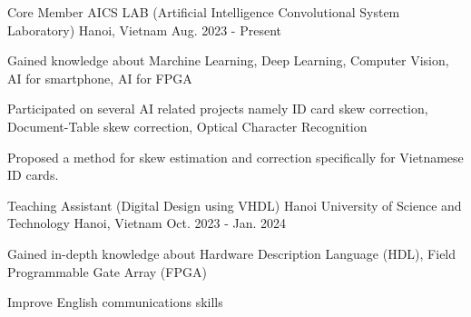 

\begin{cventries}
\cventry
{Core Member} %
{AICS LAB (Artificial Intelligence Convolutional System Laboratory)} %
{Hanoi, Vietnam} %
{Aug. 2023 - Present} %
{
  \begin{cvitems} %
    \item {Gained knowledge about Marchine Learning, Deep Learning, Computer Vision, AI for smartphone, AI for FPGA}
    \item {Participated on several AI related projects namely ID card skew correction, Document-Table skew correction, Optical Character Recognition}
    \item Proposed a method for skew estimation and correction specifically for
    Vietnamese ID cards.
  \end{cvitems}
}

\cventry
{Teaching Assistant (Digital Design using VHDL)} %
{Hanoi University of Science and Technology} %
{Hanoi, Vietnam} %
{Oct. 2023 - Jan. 2024} %
{
  \begin{cvitems} %
    \item {Gained in-depth knowledge about Hardware Description Language (HDL), Field Programmable Gate Array (FPGA)}
    \item {Improve English communications skills}
  \end{cvitems}
}
\end{cventries}

